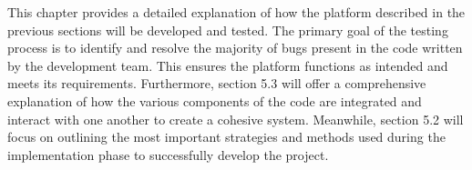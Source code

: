 This chapter provides a detailed explanation of how the platform described in the previous sections will be developed and tested. The primary goal of the testing process is to identify and resolve the majority of bugs present in the code written by the development team. This ensures the platform functions as intended and meets its requirements. Furthermore, section 5.3 will offer a comprehensive explanation of how the various components of the code are integrated and interact with one another to create a cohesive system. Meanwhile, section 5.2 will focus on outlining the most important strategies and methods used during the implementation phase to successfully develop the project.


